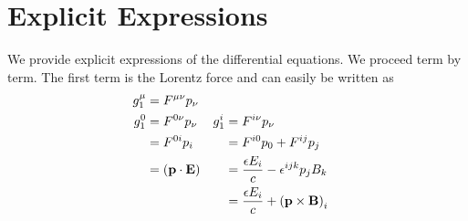 \documentclass[10pt,letterpaper,extrafontsizes, onecolumn,openright]{memoir}
\begin{document}



\section{Explicit Expressions}
We provide explicit expressions of the differential equations. We proceed term
by term. The first term is the Lorentz force and can easily be written as
  \begin{align*}
    g_1^\mu &= F^{\mu\nu}p_\nu                  &  \\
    g_1^0   &= F^{0\nu}p_\nu                    & g_1^i   &= F^{i\nu}p_\nu    \\
            &= F^{0i}p_i                       &         &= F^{i0}p_0+F^{ij}p_j        \\
            &= \left(\vb{p}\cdot\vb{E}\right)   &         &= \frac{\epsilon E_i}{c}-\epsilon^{ijk}p_jB_k \\
            &                                   &         &= \frac{\epsilon E_i}{c}+\left(\vb{p}\times\vb{B}\right)_i
  \end{align*}
\end{document}
